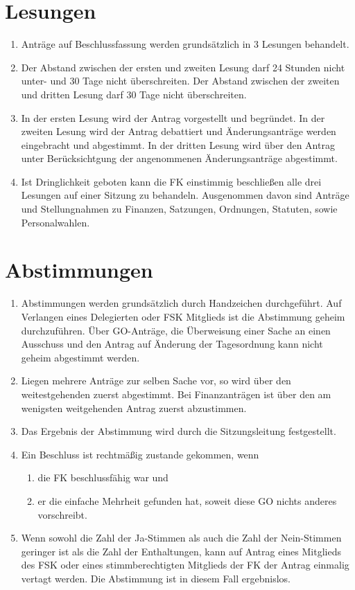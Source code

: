 \documentclass{article}
\begin{document}
\section{Lesungen}
\begin{enumerate}[(1)]
    \item Anträge auf Beschlussfassung werden grundsätzlich in 3 Lesungen behandelt.
    \item Der Abstand zwischen der ersten und zweiten Lesung darf 24 Stunden nicht unter- und 30 Tage nicht überschreiten.
    	Der Abstand zwischen der zweiten und dritten Lesung darf 30 Tage nicht überschreiten.
    \item In der ersten Lesung wird der Antrag vorgestellt und begründet.
    	In der zweiten Lesung wird der Antrag debattiert und Änderungsanträge werden eingebracht und abgestimmt.
    	In der dritten Lesung wird über den Antrag unter Berücksichtgung der angenommenen Änderungsanträge abgestimmt.
    \item Ist Dringlichkeit geboten kann die FK einstimmig beschließen alle drei Lesungen auf einer Sitzung zu behandeln. 
    	Ausgenommen davon sind Anträge und Stellungnahmen zu Finanzen, Satzungen, Ordnungen, Statuten, sowie Personalwahlen.
\end{enumerate}

\section{Abstimmungen}
\begin{enumerate}[(1)]
    \item Abstimmungen werden grundsätzlich durch Handzeichen durchgeführt. Auf Verlangen eines Delegierten oder FSK Mitglieds ist die Abstimmung geheim durchzuführen. Über GO-Anträge, die Überweisung einer Sache an einen Ausschuss und den Antrag auf Änderung der Tagesordnung kann nicht geheim abgestimmt werden.
    \item Liegen mehrere Anträge zur selben Sache vor, so wird über den weitestgehenden zuerst abgestimmt. 
    	Bei Finanzanträgen ist über den am wenigsten weitgehenden Antrag zuerst abzustimmen.
    \item Das Ergebnis der Abstimmung wird durch die Sitzungsleitung festgestellt.
    \item Ein Beschluss ist rechtmäßig zustande gekommen, wenn
    \begin{enumerate}[1.]
        \item die FK beschlussfähig war und
        \item er die einfache Mehrheit gefunden hat, soweit diese GO nichts anderes vorschreibt.
    \end{enumerate}
    \item Wenn sowohl die Zahl der Ja-Stimmen als auch die Zahl der Nein-Stimmen geringer ist als die Zahl der Enthaltungen, kann auf Antrag eines Mitglieds des FSK oder eines stimmberechtigten Mitglieds der FK der Antrag einmalig vertagt werden. 
    	Die Abstimmung ist in diesem Fall ergebnislos.
\end{enumerate}
\end{document}
